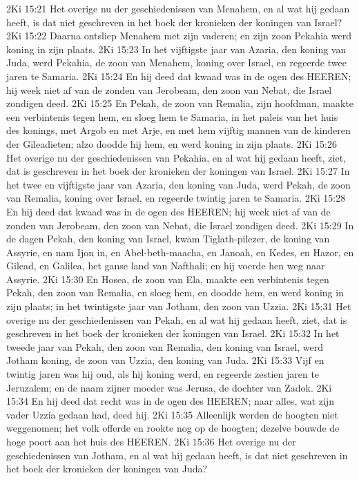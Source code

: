 2Ki 15:21  Het overige nu der geschiedenissen van Menahem, en al wat hij gedaan heeft, is dat niet geschreven in het boek der kronieken der koningen van Israel?
2Ki 15:22  Daarna ontsliep Menahem met zijn vaderen; en zijn zoon Pekahia werd koning in zijn plaats.
2Ki 15:23  In het vijftigste jaar van Azaria, den koning van Juda, werd Pekahia, de zoon van Menahem, koning over Israel, en regeerde twee jaren te Samaria.
2Ki 15:24  En hij deed dat kwaad was in de ogen des HEEREN; hij week niet af van de zonden van Jerobeam, den zoon van Nebat, die Israel zondigen deed.
2Ki 15:25  En Pekah, de zoon van Remalia, zijn hoofdman, maakte een verbintenis tegen hem, en sloeg hem te Samaria, in het paleis van het huis des konings, met Argob en met Arje, en met hem vijftig mannen van de kinderen der Gileadieten; alzo doodde hij hem, en werd koning in zijn plaats.
2Ki 15:26  Het overige nu der geschiedenissen van Pekahia, en al wat hij gedaan heeft, ziet, dat is geschreven in het boek der kronieken der koningen van Israel.
2Ki 15:27  In het twee en vijftigste jaar van Azaria, den koning van Juda, werd Pekah, de zoon van Remalia, koning over Israel, en regeerde twintig jaren te Samaria.
2Ki 15:28  En hij deed dat kwaad was in de ogen des HEEREN; hij week niet af van de zonden van Jerobeam, den zoon van Nebat, die Israel zondigen deed.
2Ki 15:29  In de dagen Pekah, den koning van Israel, kwam Tiglath-pilezer, de koning van Assyrie, en nam Ijon in, en Abel-beth-maacha, en Janoah, en Kedes, en Hazor, en Gilead, en Galilea, het ganse land van Nafthali; en hij voerde hen weg naar Assyrie.
2Ki 15:30  En Hosea, de zoon van Ela, maakte een verbintenis tegen Pekah, den zoon van Remalia, en sloeg hem, en doodde hem, en werd koning in zijn plaats; in het twintigste jaar van Jotham, den zoon van Uzzia.
2Ki 15:31  Het overige nu der geschiedenissen van Pekah, en al wat hij gedaan heeft, ziet, dat is geschreven in het boek der kronieken der koningen van Israel.
2Ki 15:32  In het tweede jaar van Pekah, den zoon van Remalia, den koning van Israel, werd Jotham koning, de zoon van Uzzia, den koning van Juda.
2Ki 15:33  Vijf en twintig jaren was hij oud, als hij koning werd, en regeerde zestien jaren te Jeruzalem; en de naam zijner moeder was Jerusa, de dochter van Zadok.
2Ki 15:34  En hij deed dat recht was in de ogen des HEEREN; naar alles, wat zijn vader Uzzia gedaan had, deed hij.
2Ki 15:35  Alleenlijk werden de hoogten niet weggenomen; het volk offerde en rookte nog op de hoogten; dezelve bouwde de hoge poort aan het huis des HEEREN.
2Ki 15:36  Het overige nu der geschiedenissen van Jotham, en al wat hij gedaan heeft, is dat niet geschreven in het boek der kronieken der koningen van Juda?

